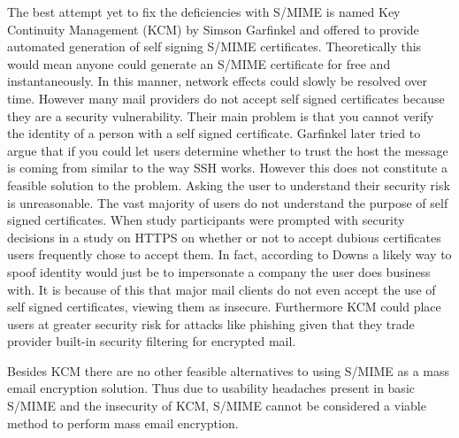 \documentclass[10pt]{article}
\begin{document}
\begin{multicols}{2}
\par The best attempt yet to fix the deficiencies with S/MIME is named Key Continuity Management (KCM) by Simson Garfinkel and offered to provide automated generation of self signing S/MIME certificates\cite{garfinkel2005johnny}. Theoretically this would mean anyone could generate an S/MIME certificate for free and instantaneously. In this manner, network effects could slowly be resolved over time. However many mail providers do not accept self signed certificates because they are a security vulnerability. Their main problem is that you cannot verify the identity of a person with a self signed certificate. Garfinkel later tried to argue that if you could let users determine whether to trust the host the message is coming from similar to the way SSH works\cite{garfinkel2005make}. However this does not constitute a feasible solution to the problem. Asking the user to understand their security risk is unreasonable. The vast majority of users do not understand the purpose of self signed certificates\cite{downs2006decision}. When study participants were prompted with security decisions in a study on HTTPS on whether or not to accept dubious certificates users frequently chose to accept them\cite{callegati2009man}. In fact, according to Downs a likely way to spoof identity would just be to impersonate a company the user does business with\cite{downs2006decision}. It is because of this that major mail clients do not even accept the use of self signed certificates, viewing them as insecure\cite{force-use-of-self}. Furthermore KCM could place users at greater security risk for attacks like phishing given that they trade provider built-in security filtering for encrypted mail.
\par Besides KCM there are no other feasible alternatives to using S/MIME as a mass email encryption solution. Thus due to usability headaches present in basic S/MIME and the insecurity of KCM, S/MIME cannot be considered a viable method to perform mass email encryption.

\end{multicols}
\end{document}
